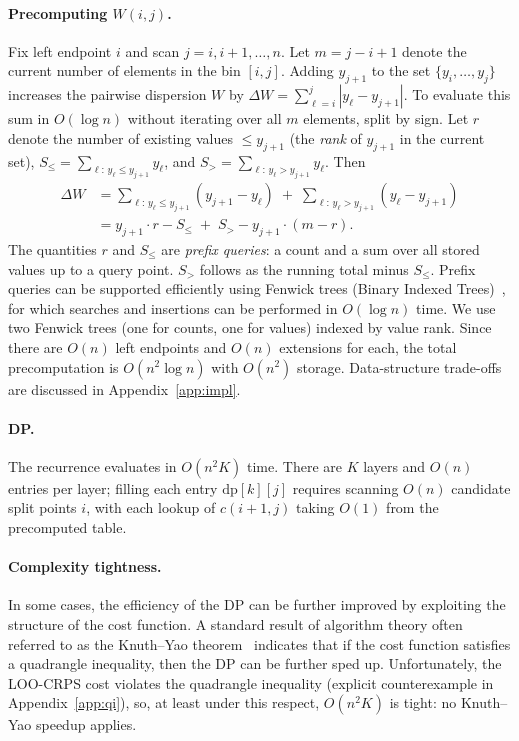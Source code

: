 \documentclass[11pt]{article}
\begin{document}
\paragraph{Precomputing $W(i,j)$.}
Fix left endpoint $i$ and scan $j = i, i+1, \ldots, n$.
Let $m = j - i + 1$ denote the current number of elements in the bin $[i, j]$.
Adding $y_{j+1}$ to the set $\{y_i, \ldots, y_j\}$ increases the pairwise
dispersion $W$ by
$\Delta W = \sum_{\ell=i}^{j}|y_\ell - y_{j+1}|$.
To evaluate this sum in $O(\log n)$ without iterating over all $m$ elements,
split by sign.
Let $r$ denote the number of existing values $\le y_{j+1}$
(the \emph{rank} of $y_{j+1}$ in the current set),
$S_{\le} = \sum_{\ell:\, y_\ell \le y_{j+1}} y_\ell$,
and $S_{>} = \sum_{\ell:\, y_\ell > y_{j+1}} y_\ell$.
Then
\begin{align*}
  \Delta W
  &= \sum_{\ell:\, y_\ell \le y_{j+1}} (y_{j+1} - y_\ell)
   \;+\; \sum_{\ell:\, y_\ell > y_{j+1}} (y_\ell - y_{j+1}) \\
  &= y_{j+1} \cdot r - S_{\le}
   \;+\; S_{>} - y_{j+1}\cdot(m - r).
\end{align*}
The quantities $r$ and $S_{\le}$ are \emph{prefix queries}: a count and a sum
over all stored values up to a query point. $S_{>}$ follows as the running total minus
$S_{\le}$.
Prefix queries can be supported efficiently using Fenwick trees 
(Binary Indexed Trees)~\citep{Fenwick1994}, for which searches and insertions 
can be performed in $O(\log n)$ time. We use two Fenwick trees (one for counts, one 
for values) indexed by value rank.  
Since there are $O(n)$ left endpoints and $O(n)$ extensions for each,
the total precomputation is $O(n^2 \log n)$ with $O(n^2)$ storage.
Data-structure trade-offs are discussed in
Appendix~\ref{app:impl}.

\paragraph{DP.}
The recurrence evaluates in $O(n^2 K)$ time.
There are $K$ layers and $O(n)$ entries per layer; filling each entry
$\mathrm{dp}[k][j]$ requires scanning $O(n)$ candidate split points $i$,
with each lookup of $c(i+1,j)$ taking $O(1)$ from the precomputed table.

\paragraph{Complexity tightness.}
In some cases, the efficiency of the DP can be further improved by exploiting the structure of the cost function.
A standard result of algorithm theory often referred to as the Knuth--Yao theorem~\citep{Knuth1971,Yao1980} 
indicates that if the cost function satisfies a quadrangle inequality, then the DP can be further sped up. 
Unfortunately, the LOO-CRPS cost violates the quadrangle inequality (explicit counterexample in
Appendix~\ref{app:qi}), so, at least under this respect, $O(n^2 K)$ is tight: no Knuth--Yao speedup applies.
\end{document}
